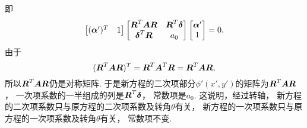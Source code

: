 即\begin{equation*}
	\begin{bmatrix}
		(\boldsymbol\alpha')^T & 1
	\end{bmatrix}
	\begin{bmatrix}
		\boldsymbol{R}^T \boldsymbol{A} \boldsymbol{R} & \boldsymbol{R}^T \boldsymbol\delta \\
		\boldsymbol\delta^T \boldsymbol{R} & a_0
	\end{bmatrix}
	\begin{bmatrix}
		\boldsymbol\alpha' \\ 1
	\end{bmatrix}
	= 0.
\end{equation*}
由于\begin{equation*}
	(\boldsymbol{R}^T \boldsymbol{A} \boldsymbol{R})^T
	= \boldsymbol{R}^T \boldsymbol{A}^T \boldsymbol{R}
	= \boldsymbol{R}^T \boldsymbol{A} \boldsymbol{R},
\end{equation*}
所以\(\boldsymbol{R}^T \boldsymbol{A} \boldsymbol{R}\)仍是对称矩阵.
于是新方程的二次项部分\(\phi'(x',y')\)的矩阵为\(\boldsymbol{R}^T \boldsymbol{A} \boldsymbol{R}\)，
一次项系数的一半组成的列是\(\boldsymbol{R}^T \boldsymbol\delta\)，
常数项是\(a_0\).
这说明，经过转轴，
新方程的二次项系数只与原方程的二次项系数及转角\(\theta\)有关，
新方程的一次项系数只与原方程的一次项系数及转角\(\theta\)有关，
常数项不变.

